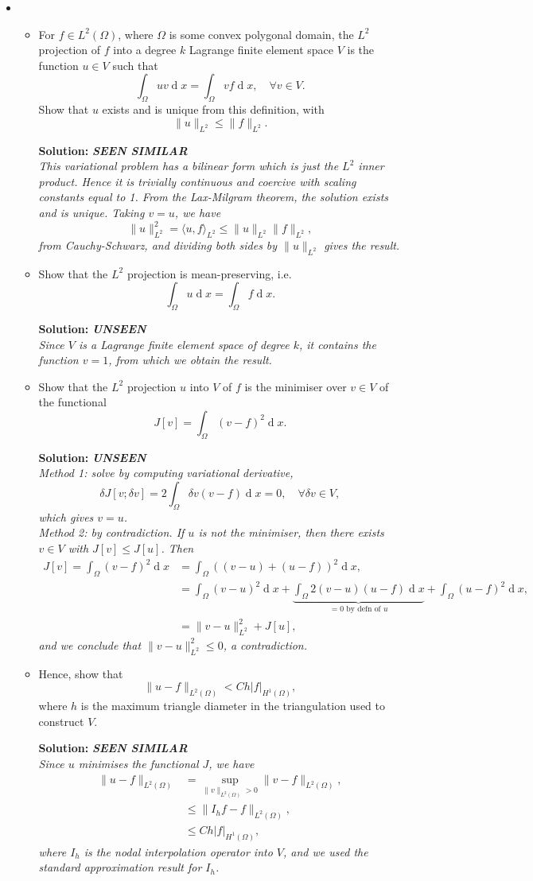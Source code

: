 \documentclass[12pt]{article}
\newcommand{\similar}{{\bfseries SEEN SIMILAR\\}}
\newcommand{\unseen}{{\bfseries UNSEEN\\}}
\newcommand{\exammarks}[1]{\begin{flushright}[#1 marks]\end{flushright}}%
\DeclareMathOperator{\diff}{d}
\newcommand{\soln}[1]{{\bfseries Solution:} {\itshape \color{blue} #1}}
\newcommand{\soln}[1]{}
\newenvironment{Question}[1] 
 {\begin{itemize} \item[\large #1.~~]}{\end{itemize} \medskip}
\newcommand{\BeginParts}{\begin{itemize}}
\newcommand{\Part}[1]{\item [(#1)~~]}
\newcommand{\EndParts}{\end{itemize}}
\begin{document}
\begin{Question}{4}
  \BeginParts
  \Part{a}  For $f \in L^2(\Omega)$, where $\Omega$ is some convex
  polygonal domain, the $L^2$ projection of $f$ into a degree $k$
  Lagrange finite element space $V$ is the function $u \in V$ such
  that
  \[
  \int_\Omega uv \diff x = \int_\Omega vf \diff x, \quad \forall
  v \in V.
  \]
  Show that $u$ exists and is unique from this definition, with
  \[
  \|u\|_{L^2} \leq \|f\|_{L^2}.
  \]
  \exammarks{5}
  \soln{\similar
    This variational problem has a bilinear form which is just the
    $L^2$ inner product. Hence it is trivially continuous and coercive
    with scaling constants equal to 1. From the Lax-Milgram theorem,
    the solution exists and is unique. Taking $v=u$, we have
    \[
    \|u\|_{L^2}^2 = \langle u, f \rangle_{L^2} \leq \|u\|_{L^2}\|f\|_{L^2},
    \]
    from Cauchy-Schwarz, and dividing both sides by $\|u\|_{L^2}$
    gives the result.
  }
  \Part{b} Show that the $L^2$ projection is mean-preserving, i.e.
  \[
  \int_{\Omega} u \diff x = \int_{\Omega} f \diff x.
  \]
  \exammarks{5}
  \soln{\unseen
    Since $V$ is a Lagrange finite element space of degree $k$, it contains
    the function $v=1$, from which we obtain the result.
  }
  \Part{c} Show that the $L^2$ projection $u$ into $V$ of $f$ is the
  minimiser over $v \in V$ of the functional
  \[
  J[v] = \int_{\Omega} (v-f)^2 \diff x.
  \]
  \exammarks{5}
  \soln{\unseen
    Method 1: solve by computing variational derivative,
    \[
    \delta J[v; \delta v] = 2\int_\Omega \delta v(v-f)\diff x = 0,
    \quad \forall \delta v \in V,
    \]
    which gives $v=u$.\\
    Method 2: by contradiction. If $u$ is not the minimiser, then
    there exists $v\in V$ with
    $J[v] \leq J[u]$.
    Then
    \begin{align*}
      J[v] = \int_\Omega (v-f)^2 \diff x &
      = \int_\Omega ((v-u) + (u-f))^2 \diff x,\\
      & = \int_\Omega (v-u)^2\diff x + \underbrace{\int_\Omega 2(v-u)(u-f)
        \diff x}_{=0\mbox{ by defn of }u} + \int_\Omega (u-f)^2\diff x,\\
      & = \|v-u\|^2_{L^2} + J[u],
    \end{align*}
    and we conclude that $\|v-u\|^2_{L^2} \leq 0$, 
    a contradiction.
  }
  \Part{d} Hence, show that
  \[
  \|u-f\|_{L^2(\Omega)} < Ch |f|_{H^1(\Omega)},
  \]
  where $h$ is the maximum triangle diameter in the triangulation used
  to construct $V$.
  \exammarks{5}
  \soln{\similar
    Since $u$ minimises the functional $J$, we have
    \begin{align*}
      \|u-f\|_{L^2(\Omega)} & = \sup_{\|v\|_{L^2(\Omega)}>0}
      \|v-f\|_{L^2(\Omega)}, \\
      & \leq \|I_hf -f\|_{L^2(\Omega)}, \\
      & \leq Ch|f|_{H^1(\Omega)},
    \end{align*}
    where $I_h$ is the nodal interpolation operator into $V$, and
    we used  the standard approximation result for $I_h$.
  }
  \EndParts
\end{Question}
\end{document}
